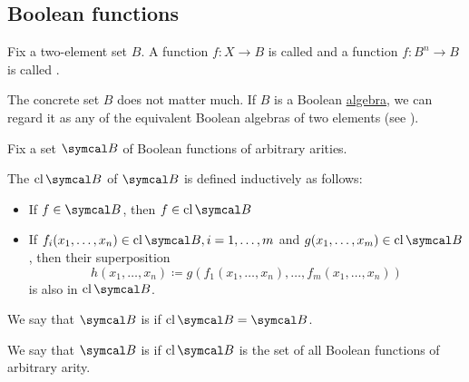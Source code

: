 \subsection{Boolean functions}\label{subsec:boolean_functions}

\begin{definition}\label{def:boolean_function}
  Fix a two-element set \( B \). A function \( f: X \to B \) is called  and a function \( f: B^n \to B \) is called .

  The concrete set \( B \) does not matter much. If \( B \) is a Boolean \hyperref[def:boolean_algebra]{algebra}, we can regard it as any of the equivalent Boolean algebras of two elements (see ).
\end{definition}

\begin{definition}\label{def:boolean_closure}
  Fix a set \( \Cal{B} \) of Boolean functions of arbitrary arities.

  The  \( \Cl{\Cal{B}} \) of \( \Cal{B} \) is defined inductively as follows:
  \begin{itemize}
    \item If \( f \in \Cal{B} \), then \( f \in \Cl{\Cal{B}} \)
    \item If \( f_i(x_1, \ldots, x_n) \in \Cl{\Cal{B}}, i = 1, \ldots, m \) and \( g(x_1, \ldots, x_m) \in \Cl{\Cal{B}} \), then their superposition
    \begin{equation*}
      h(x_1, \ldots, x_n) \coloneqq g(f_1(x_1, \ldots, x_n), \ldots, f_m(x_1, \ldots, x_n))
    \end{equation*}
    is also in \( \Cl{\Cal{B}} \).
  \end{itemize}

  We say that \( \Cal{B} \) is  if \( \Cl{\Cal{B}} = \Cal{B} \).

  We say that \( \Cal{B} \) is  if \( \Cl{\Cal{B}} \) is the set of all Boolean functions of arbitrary arity.
\end{definition}

